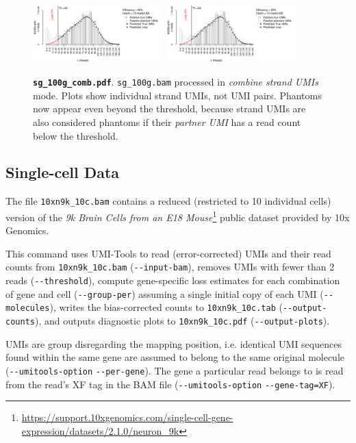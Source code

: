 \documentclass[a4paper]{scrartcl}
\makeatletter
\let\subsection@phlo\subsection
\renewcommand\subsection{\needspace{5\baselineskip}\subsection@phlo}
\newcommand{\shellscript}[1]{\bgroup\topsep=0pt\partopsep=0pt\shaded%
	\endshaded\egroup}
\newcommand{\ddarg}[1]{\texttt{-{}-#1}}
\makeatother
\begin{document}
\begin{figure}[H]
{\centering
\includegraphics[width=0.45\textwidth,page=1]{../examples/sg_100g_comb.pdf}\hfill
\includegraphics[width=0.45\textwidth,page=2]{../examples/sg_100g_comb.pdf}
\\}
\caption*{\textbf{\texttt{sg\_100g\_comb.pdf}}. \texttt{sg\_100g.bam} processed in \emph{combine strand UMIs} mode. Plots show individual strand UMIs, not UMI pairs. Phantoms now appear even beyond the threshold, because strand UMIs are also considered phantoms if their \emph{partner UMI} has a read count below the threshold.}
\end{figure}

\subsection{Single-cell Data}

The file \texttt{10xn9k\_10c.bam} contains a reduced (restricted to 10 individual cells) version of the \emph{9k Brain Cells from an E18 Mouse}\footnote{\url{https://support.10xgenomics.com/single-cell-gene-expression/datasets/2.1.0/neuron_9k}} public dataset provided by 10x Genomics. 

\shellscript{../examples/10xn9k_10c.cmd}

This command uses UMI-Tools to read (error-corrected) UMIs and their read counts from \texttt{10xn9k\_10c.bam} (\ddarg{input-bam}), removes UMIs with fewer than 2 reads (\ddarg{threshold}), compute gene-specific loss estimates for each combination of gene and cell (\ddarg{group-per}) assuming a single initial copy of each UMI (\ddarg{molecules}), writes the bias-corrected counts to \texttt{10xn9k\_10c.tab} (\ddarg{output-counts}), and outputs diagnostic plots to \texttt{10xn9k\_10c.pdf} (\ddarg{output-plots}). 

UMIs are group disregarding the mapping position, i.e. identical UMI sequences found within the same gene are assumed to belong to the same original molecule (\ddarg{umitools-option} \ddarg{per-gene}). The gene a particular read belongs to is read from the read's XF tag in the BAM file (\ddarg{umitools-option} \ddarg{gene-tag=XF}).
\end{document}
